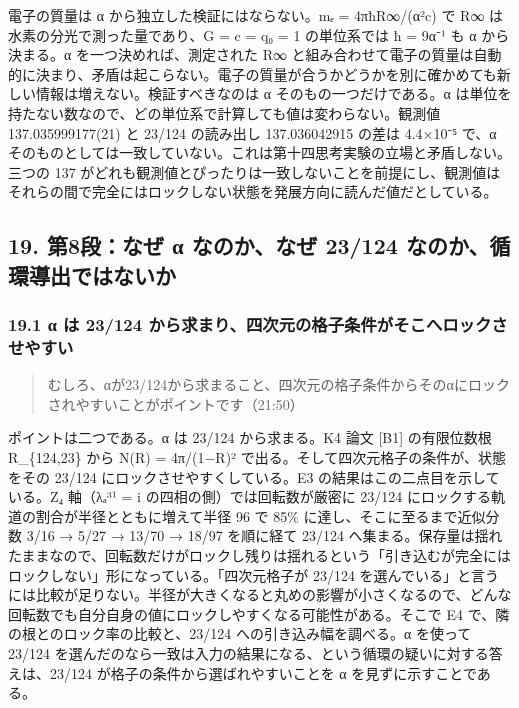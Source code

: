 \documentclass[
  a4paper,
]{ltjsarticle}
\begin{document}
電子の質量は α から独立した検証にはならない。mₑ = 4πħR∞/(α²c) で R∞
は水素の分光で測った量であり、G = c = q₀ = 1 の単位系では ħ = 9α⁻¹ も α
から決まる。α を一つ決めれば、測定された R∞
と組み合わせて電子の質量は自動的に決まり、矛盾は起こらない。電子の質量が合うかどうかを別に確かめても新しい情報は増えない。検証すべきなのは
α そのもの一つだけである。α
は単位を持たない数なので、どの単位系で計算しても値は変わらない。観測値
137.035999177(21) と 23/124 の読み出し 137.036042915 の差は 4.4×10⁻⁵
で、α
そのものとしては一致していない。これは第十四思考実験の立場と矛盾しない。三つの
137
がどれも観測値とぴったりは一致しないことを前提にし、観測値はそれらの間で完全にはロックしない状態を発展方向に読んだ値だとしている。

\subsection{19. 第8段：なぜ α なのか、なぜ 23/124
なのか、循環導出ではないか}\label{ux7b2c8ux6bb5ux306aux305c-ux3b1-ux306aux306eux304bux306aux305c-23124-ux306aux306eux304bux5faaux74b0ux5c0eux51faux3067ux306fux306aux3044ux304b}

\subsubsection{19.1 α は 23/124
から求まり、四次元の格子条件がそこへロックさせやすい}\label{ux3b1-ux306f-23124-ux304bux3089ux6c42ux307eux308aux56dbux6b21ux5143ux306eux683cux5b50ux6761ux4ef6ux304cux305dux3053ux3078ux30edux30c3ux30afux3055ux305bux3084ux3059ux3044}

\begin{quote}
むしろ、αが23/124から求まること、四次元の格子条件からそのαにロックされやすいことがポイントです（21:50）
\end{quote}

ポイントは二つである。α は 23/124 から求まる。K4 論文 {[}B1{]}
の有限位数根 R\_\{124,23\} から N(R) = 4π/(1−R)²
で出る。そして四次元格子の条件が、状態をその 23/124
にロックさせやすくしている。E3 の結果はこの二点目を示している。Z₄
軸（λₐ³¹ = i の四相の側）では回転数が厳密に 23/124
にロックする軌道の割合が半径とともに増えて半径 96 で 85\%
に達し、そこに至るまで近似分数 3/16 → 5/27 → 13/70 → 18/97 を順に経て
23/124
へ集まる。保存量は揺れたままなので、回転数だけがロックし残りは揺れるという「引き込むが完全にはロックしない」形になっている。「四次元格子が
23/124
を選んでいる」と言うには比較が足りない。半径が大きくなると丸めの影響が小さくなるので、どんな回転数でも自分自身の値にロックしやすくなる可能性がある。そこで
E4 で、隣の根とのロック率の比較と、23/124 への引き込み幅を調べる。α
を使って 23/124
を選んだのなら一致は入力の結果になる、という循環の疑いに対する答えは、23/124
が格子の条件から選ばれやすいことを α を見ずに示すことである。
\end{document}
